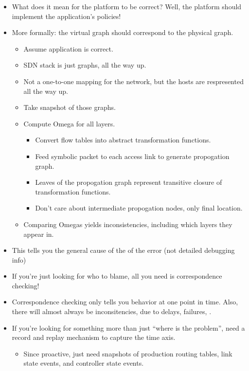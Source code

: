 \begin{itemize}
\item What does it mean for the platform to be correct? Well, the platform
should implement the application's policies!
\item More formally: the virtual graph should correspond to the physical
graph.
    \begin{itemize}
    \item Assume application is correct.
    \item SDN stack is just graphs, all the way up.
    \item Not a one-to-one mapping for the network, but the hosts are respresented all the way
    up.
    \item Take snapshot of those graphs.
    \item Compute Omega for all layers.
        \begin{itemize}
        \item Convert flow tables into abstract transformation functions.
        \item Feed symbolic packet to each access link to generate
        propogation graph.
        \item Leaves of the propogation graph represent transitive closure of
        transformation functions.
        \item Don't care about intermediate propogation nodes, only final
        location.
        \end{itemize}
    \item Comparing Omegas yields inconsistencies, including which layers
    they appear in.
    \end{itemize}
\item This tells you the general cause of the of the error (not detailed
debugging info)
\item If you're just looking for who to blame, all you need is correspondence
checking!
\item Correspondence checking only tells you behavior at one point in time.
Also, there will almost always be inconsitencies, due to delays, failures,
\etc.
\item {} If you're looking for something more than just ``where is the problem'', need a record and replay mechanism to capture the time axis.
    \begin{itemize}
    \item Since proactive, just need snapshots of production routing tables,
    link state events, and controller state events.

\end{itemize}
\end{itemize}
